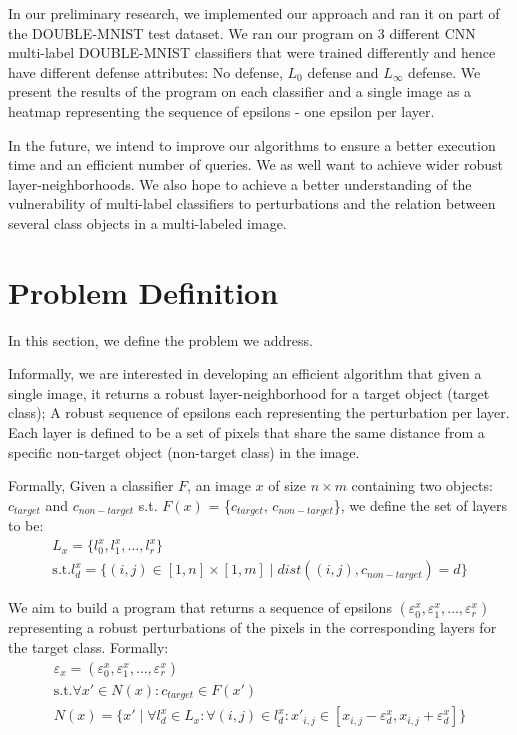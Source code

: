 \documentclass[11pt]{article}
\begin{document}
In our preliminary research, we implemented our approach and ran it on part of the DOUBLE-MNIST test dataset.
We ran our program on 3 different CNN multi-label DOUBLE-MNIST classifiers that were trained differently and hence have different defense attributes: No defense, $L_0$ defense and $L_\infty$ defense.
We present the results of the program on each classifier and a single image as a heatmap representing the sequence of epsilons - one epsilon per layer.

In the future, we intend to improve our algorithms to ensure a better execution time and an efficient number of queries.
We as well want to achieve wider robust layer-neighborhoods.
We also hope to achieve a better understanding of the vulnerability of multi-label classifiers to perturbations and the relation between several class objects in a multi-labeled image.

\section{Problem Definition}
In this section, we define the problem we address.

Informally, we are interested in developing an efficient algorithm that given a single image, it returns a robust layer-neighborhood for a target object (target class);
A robust sequence of epsilons each representing the perturbation per layer.
Each layer is defined to be a set of pixels that share the same distance from a specific non-target object (non-target class) in the image.

Formally, Given a classifier $F$, an image $x$ of size $n\times m$ containing two objects: $c_{target}$ and $c_{non-target}$ \textrm{s.t.} $F(x)$ = \{$c_{target}$, $c_{non-target}$\},
we define the set of layers to be:
\begin{gather*}
     L_x = \{l_0^x, l_1^x, \ldots, l_r^x\}\\
    \textrm{s.t.}  l_d^x = \{(i,j) \in [1,n]\times [1,m] \mid dist((i, j), c_{non-target}) = d\}
\end{gather*}

We aim to build a program that returns a sequence of epsilons $(\varepsilon_0^x, \varepsilon_1^x, \ldots, \varepsilon_r^x)$ representing a robust perturbations of the pixels in the corresponding layers for the target class.
Formally:
\begin{gather*}
     \varepsilon_x = (\varepsilon_0^x, \varepsilon_1^x, \ldots, \varepsilon_r^x)\\
    \textrm{s.t.}  \forall x' \in N(x): c_{target} \in F(x')\\
    N(x) = \{x' \mid \forall l_d^x\in L_x: \forall (i,j)\in l_d^x: x'_{i,j} \in [x_{i,j}-\varepsilon_d^x, x_{i,j}+\varepsilon_d^x]\}\\
\end{gather*}
\end{document}

